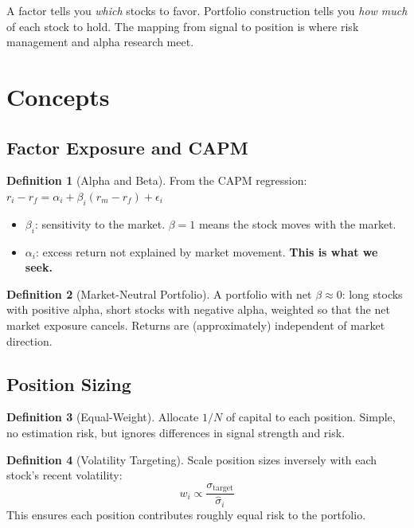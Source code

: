 \documentclass[a4paper, 11pt]{report}
\theoremstyle{definition}
\newtheorem{definition}{Definition}[chapter]
\theoremstyle{remark}
\begin{document}
A factor tells you \emph{which} stocks to favor.  Portfolio construction tells
you \emph{how much} of each stock to hold.  The mapping from signal to position
is where risk management and alpha research meet.

\section{Concepts}

\subsection{Factor Exposure and CAPM}

\begin{definition}[Alpha and Beta]
    From the CAPM regression: $r_i - r_f = \alpha_i + \beta_i (r_m - r_f) + \epsilon_i$
    \begin{itemize}
        \item $\beta_i$: sensitivity to the market.  $\beta = 1$ means the stock
              moves with the market.
        \item $\alpha_i$: excess return not explained by market movement.
              \textbf{This is what we seek.}
    \end{itemize}
\end{definition}

\begin{definition}[Market-Neutral Portfolio]
    A portfolio with net $\beta \approx 0$: long stocks with positive alpha,
    short stocks with negative alpha, weighted so that the net market exposure
    cancels.  Returns are (approximately) independent of market direction.
\end{definition}

\subsection{Position Sizing}

\begin{definition}[Equal-Weight]
    Allocate $1/N$ of capital to each position.  Simple, no estimation risk,
    but ignores differences in signal strength and risk.
\end{definition}

\begin{definition}[Volatility Targeting]
    Scale position sizes inversely with each stock's recent volatility:
    \[
        w_i \propto \frac{\sigma_{\text{target}}}{\hat{\sigma}_i}
    \]
    This ensures each position contributes roughly equal risk to the portfolio.
\end{definition}
\end{document}
